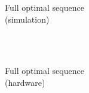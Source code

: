 \documentclass[aspectratio=169]{beamer}
\begin{document}
\begin{frame}
	\centering Full optimal sequence \\(simulation)
	\begin{multicols}{2}
		\vspace{0.5cm}\hphantom{e}\\
		
		\vfill\null
		\columnbreak
		\vspace{0.5cm}\hphantom{e}\\
		\begin{figure}
			\centering
		\end{figure}
	\end{multicols}
\end{frame}

\begin{frame}
	\centering Full optimal sequence \\ (hardware)
	\begin{multicols}{2}
		\vspace{0.5cm}\hphantom{e}\\
		
		\vfill\null
		\columnbreak
		\vspace{0.5cm}\hphantom{e}\\
		\begin{figure}
			\centering
		\end{figure}
	\end{multicols}
\end{frame}
\end{document}
